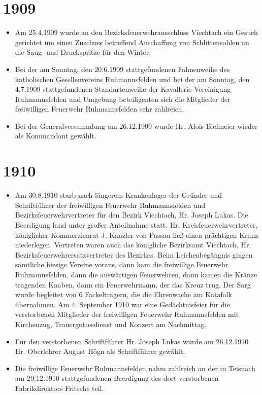 \documentclass[12pt,a4paper]{book}
\begin{document}
\section*{1909}

\begin{itemize}
\item Am 25.4.1909 wurde an den Bezirksfeuerwehrausschluss Viechtach ein Gesuch
gerichtet um einen Zuschuss betreffend Anschaffung von Schlittensohlen an die
Saug- und Druckspritze für den Winter.

\item Bei der am Sonntag, den 20.6.1909 stattgefundenen Fahnenweihe des
katholischen Gesellenvereins Ruhmannsfelden und bei der am Sonntag, den 4.7.1909
stattgefundenen Standartenweihe der Kavallerie-Vereinigung Ruhmannsfelden und
Umgebung beteiligenten sich die Mitglieder der freiwilligen Feuerwehr
Ruhmannsfelden sehr zahlreich.

\item Bei der Generalversammlung am 26.12.1909 wurde Hr. Alois Bielmeier wieder
als Kommandant gewählt.
\end{itemize}

\section*{1910}

\begin{itemize}
\item Am 30.8.1910 starb nach längerem Krankenlager der Gründer und
Schriftführer der freiwilligen Feuerwehr Ruhmannsfelden und
Bezirksfeuerwehrvertreter für den Bezirk Viechtach, Hr. Joseph Lukas. Die
Beerdigung fand unter großer Anteilnahme statt. Hr. Kreisfeuerwehrvertreter,
königlicher Kommerzienrat J. Kanzler von Passau ließ einen prächtigen Kranz
niederlegen. Vertreten waren auch das königliche Bezirksamt Viechtach, Hr.
Bezirksfeuerwehrersatzvertreter des Bezirkes. Beim Leichenbegängnis gingen
sämtliche hiesige Vereine voraus, dann kam die freiwillige Feuerwehr
Ruhmannsfelden, dann die auswärtigen Feuerwehren, dann kamen die Kränze
tragenden Knaben, dann ein Feuerwehrmann, der das Kreuz trug. Der Sarg wurde
begleitet von 6 Fackelträgern, die die Ehrenwache am Katafalk übernahmen. Am 4.
September 1910 war eine Gedächtnisfeier für die verstorbenen Mitglieder der
freiwilligen Feuerwehr Ruhmannsfelden mit Kirchenzug, Trauergottesdienst und
Konzert am Nachmittag.

\item Für den verstorbenen Schriftführer Hr. Joseph Lukas wurde am 26.12.1910
Hr. Oberlehrer August Högn als Schriftführer gewählt.

\item Die freiwillige Feuerwehr Ruhmannsfelden nahm zahlreich an der in Teisnach
am 29.12.1910 stattgefundenen Beerdigung des dort verstorbenen Fabrikdirektors
Fritsche teil.
\end{itemize}
\end{document}
